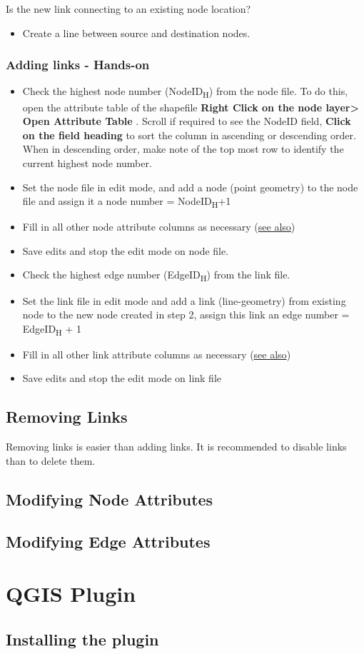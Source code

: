 \documentclass[
]{book}
\providecommand{\tightlist}{%
  \setlength{\itemsep}{0pt}\setlength{\parskip}{0pt}}
\begin{document}
Is the new link connecting to an existing node location?

\begin{itemize}
\tightlist
\item
  Create a line between source and destination nodes.
\end{itemize}

\section{Adding links - Hands-on}\label{adding-links---hands-on}

\begin{itemize}
\tightlist
\item
  Check the highest node number (NodeID\textsubscript{H}) from the node file. To do this, open the attribute table of the shapefile \textbf{Right Click on the node layer\textgreater{} Open Attribute Table} . Scroll if required to see the NodeID field, \textbf{Click on the field heading} to sort the column in ascending or descending order. When in descending order, make note of the top most row to identify the current highest node number.
\item
  Set the node file in edit mode, and add a node (point geometry) to the node file and assign it a node number = NodeID\textsubscript{H}+1
\item
  Fill in all other node attribute columns as necessary (\hyperref[modifying-node-attributes]{see also})
\item
  Save edits and stop the edit mode on node file.
\item
  Check the highest edge number (EdgeID\textsubscript{H}) from the link file.
\item
  Set the link file in edit mode and add a link (line-geometry) from existing node to the new node created in step 2, assign this link an edge number = EdgeID\textsubscript{H} + 1
\item
  Fill in all other link attribute columns as necessary (\hyperref[modifying-edge-attributes]{see also})
\item
  Save edits and stop the edit mode on link file
\end{itemize}

\chapter{Removing Links}\label{removing-links}

Removing links is easier than adding links. It is recommended to disable links than to delete them.

\chapter{Modifying Node Attributes}\label{modifying-node-attributes}

\chapter{Modifying Edge Attributes}\label{modifying-edge-attributes}

\part{QGIS Plugin}\label{part-qgis-plugin}

\chapter{Installing the plugin}\label{installing-the-plugin}
\end{document}
